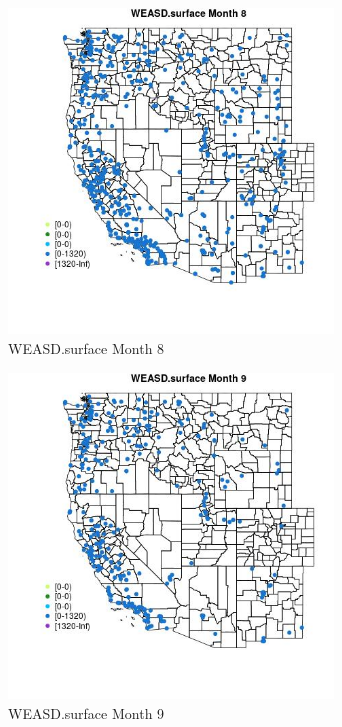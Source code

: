 \begin{figure} 
\centering  
\includegraphics[width=0.77\textwidth]{Code_Outputs/Report_ML_input_PM25_Step4_part_e_de_duplicated_aves_compiled_2019-05-18wNAs_MapObsMo8WEASDsurface.jpg} 
\caption{\label{fig:Report_ML_input_PM25_Step4_part_e_de_duplicated_aves_compiled_2019-05-18wNAsMapObsMo8WEASDsurface}WEASD.surface Month 8} 
\end{figure} 
 

\clearpage 

\begin{figure} 
\centering  
\includegraphics[width=0.77\textwidth]{Code_Outputs/Report_ML_input_PM25_Step4_part_e_de_duplicated_aves_compiled_2019-05-18wNAs_MapObsMo9WEASDsurface.jpg} 
\caption{\label{fig:Report_ML_input_PM25_Step4_part_e_de_duplicated_aves_compiled_2019-05-18wNAsMapObsMo9WEASDsurface}WEASD.surface Month 9} 
\end{figure} 
 

